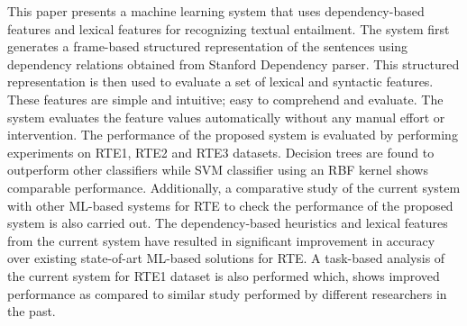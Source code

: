 This paper presents a machine learning system that uses dependency-based features and lexical features for recognizing textual entailment. The system first generates a frame-based structured representation of the sentences using dependency relations obtained from Stanford Dependency parser. This structured representation is then used to evaluate a set of lexical and syntactic features. These features are simple and intuitive; easy to comprehend and evaluate. The system evaluates the feature values automatically without any manual effort or intervention. The performance of the proposed system is evaluated by performing experiments on RTE1, RTE2 and RTE3 datasets. Decision trees are found to outperform other classifiers while SVM classifier using an RBF kernel shows comparable performance. Additionally, a comparative study of the current system with other ML-based systems for RTE to check the performance of the proposed system is also carried out. The dependency-based heuristics and lexical features from the current system have resulted in significant improvement in accuracy over existing state-of-art ML-based solutions for RTE. A task-based analysis of the current system for RTE1 dataset is also performed which, shows improved performance as compared to similar study performed by different researchers in the past.
